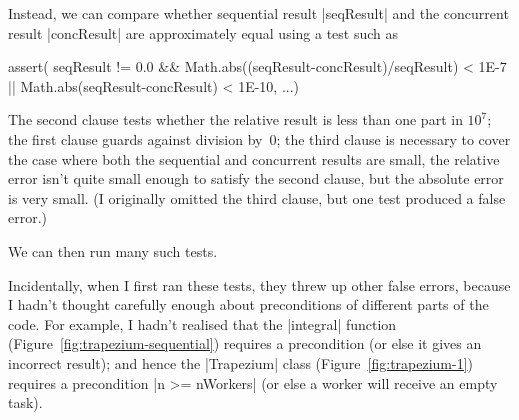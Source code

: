 
Instead, we can compare whether sequential result |seqResult| and the
concurrent result |concResult| are approximately equal using a test such as
\begin{scala}
assert(
  seqResult != 0.0 && Math.abs((seqResult-concResult)/seqResult) < 1E-7 ||
    Math.abs(seqResult-concResult) < 1E-10, ...)
\end{scala}
%
The second clause tests whether the relative result is less than one part in
$10^7$; the first clause guards against division by~$0$; the third clause is
necessary to cover the case where both the sequential and concurrent results
are small, the relative error isn't quite small enough to satisfy the second
clause, but the absolute error is very small.  (I originally omitted the third
clause, but one test produced a false error.) 

We can then run many such tests.

Incidentally, when I first ran these tests, they threw up other false errors,
because I hadn't thought carefully enough about preconditions of different
parts of the code.  For example, I hadn't realised that the |integral|
function (Figure~\ref{fig:trapezium-sequential}) requires a precondition
 (or else it gives an incorrect result); and hence the |Trapezium|
class (Figure~\ref{fig:trapezium-1}) requires a precondition |n >= nWorkers|
(or else a worker will receive an empty task).  
